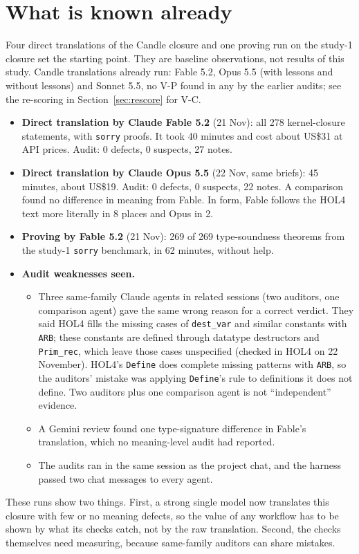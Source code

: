 \documentclass[11pt,a4paper]{article}
\newcommand{\code}[1]{\texttt{#1}}
\begin{document}
\section{What is known already}
Four direct translations of the Candle closure and one proving run on the study-1 closure set the starting point. They are baseline observations, not results of this study. Candle translations already run: Fable 5.2, Opus 5.5 (with lessons and without lessons) and Sonnet 5.5, no V-P found in any by the earlier audits; see the re-scoring in Section~\ref{sec:rescore} for V-C.
\begin{itemize}
\item \textbf{Direct translation by Claude Fable 5.2} (21 Nov): all 278 kernel-closure statements, with \code{sorry} proofs. It took 40 minutes and cost about US\$31 at API prices. Audit: 0 defects, 0 suspects, 27 notes.
\item \textbf{Direct translation by Claude Opus 5.5} (22 Nov, same briefs): 45 minutes, about US\$19. Audit: 0 defects, 0 suspects, 22 notes. A comparison found no difference in meaning from Fable. In form, Fable follows the HOL4 text more literally in 8 places and Opus in 2.
\item \textbf{Proving by Fable 5.2} (21 Nov): 269 of 269 type-soundness theorems from the study-1 \code{sorry} benchmark, in 62 minutes, without help.
\item \textbf{Audit weaknesses seen.}
  \begin{itemize}
  \item Three same-family Claude agents in related sessions (two auditors, one comparison agent) gave the same wrong reason for a correct verdict. They said HOL4 fills the missing cases of \code{dest\_var} and similar constants with \code{ARB}; these constants are defined through datatype destructors and \code{Prim\_rec}, which leave those cases unspecified (checked in HOL4 on 22 November). HOL4's \code{Define} does complete missing patterns with \code{ARB}, so the auditors' mistake was applying \code{Define}'s rule to definitions it does not define. Two auditors plus one comparison agent is not ``independent'' evidence.
  \item A Gemini review found one type-signature difference in Fable's translation, which no meaning-level audit had reported.
  \item The audits ran in the same session as the project chat, and the harness passed two chat messages to every agent.
  \end{itemize}
\end{itemize}
These runs show two things. First, a strong single model now translates this closure with few or no meaning defects, so the value of any workflow has to be shown by what its checks catch, not by the raw translation. Second, the checks themselves need measuring, because same-family auditors can share mistakes.
\end{document}

